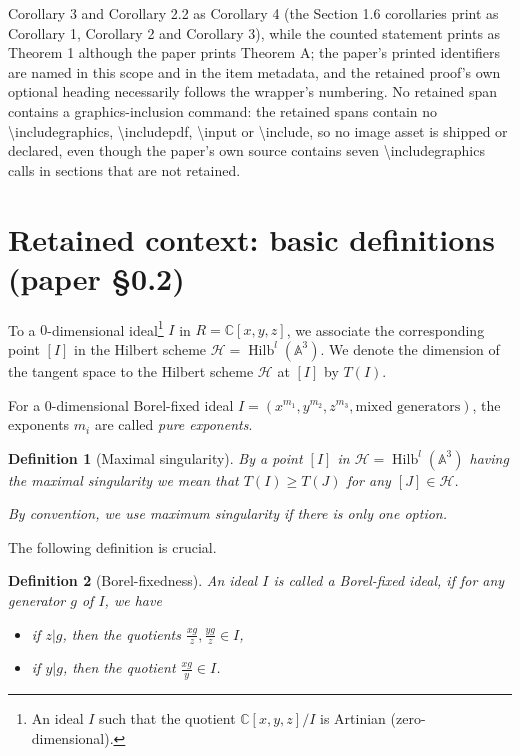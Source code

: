 \documentclass[10pt,a4paper]{amsart}
\newcommand{\BA}{{\mathbb{A}}}
\newcommand{\BC}{{\mathbb{C}}}
\newcommand{\CH}{{\mathcal H}}
\DeclareMathOperator{\Hilb}{Hilb}
\newtheorem{definition}{Definition}
\begin{document}
Corollary 3 and Corollary 2.2 as Corollary 4 (the Section 1.6 corollaries print as Corollary 1, Corollary 2 and Corollary 3), while the counted statement prints as Theorem 1 although the paper prints Theorem A; the paper's printed identifiers are named in this scope and in the item metadata, and the retained proof's own optional heading necessarily follows the wrapper's numbering. No retained span contains a graphics-inclusion command: the retained spans contain no \textbackslash includegraphics, \textbackslash includepdf, \textbackslash input or \textbackslash include, so no image asset is shipped or declared, even though the paper's own source contains seven \textbackslash includegraphics calls in sections that are not retained.
\section*{Retained context: basic definitions (paper \S0.2)}
To a $0$-dimensional ideal\footnote{An ideal $I$ such that the quotient $\BC[x,y,z]/I$ is Artinian (zero-dimensional).} $I$ in $R=\BC[x,y,z]$, we associate the corresponding point $[I]$ in the Hilbert scheme $\CH=\Hilb^l(\BA^3)$. We denote the dimension of the tangent space to the Hilbert scheme $\CH$ at $[I]$  by $T(I)$.



For a $0$-dimensional Borel-fixed ideal $I=(x^{m_1},y^{m_2},z^{m_3},\text{mixed generators})$, the exponents $m_i$ are called \emph{pure exponents}.

\begin{definition}[Maximal singularity]
    By a point $[I]$ in $\CH=\Hilb^l(\BA^3)$ \emph{having the maximal singularity} we mean that $T(I)\geq T(J)$ for any $[J]\in\CH$. 
    
    By convention, we use \emph{maximum singularity} if there is only one option.


\end{definition}

The following definition is crucial.

\begin{definition}[Borel-fixedness]\label{Def:Borel-fixedness} An ideal $I$ is called a Borel-fixed ideal,
if for any generator $g$ of $I$, we have 
\begin{itemize}
    \item if $z|g$, then the quotients $\frac{xg}{z}, \frac{yg}{z} \in I$, 
    \item if $y|g$, then the quotient  $\frac{xg}{y} \in I$. 
    \end{itemize}
\end{definition}
\end{document}
